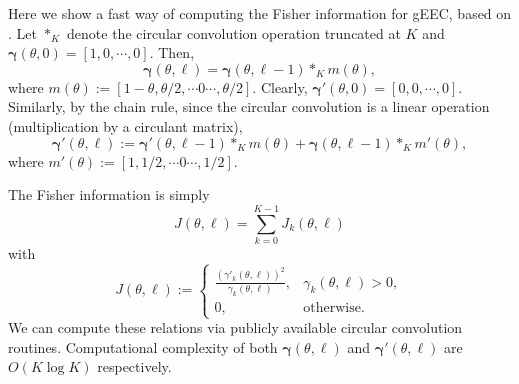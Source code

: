 \documentclass[12pt]{article}
\numberwithin{equation}{section}
\numberwithin{table}{section}
\numberwithin{figure}{section}
\newcommand{\be}{\begin{equation}}
\newcommand{\ee}{\end{equation}}
\def\bgamma{\boldsymbol{\gamma}}
\begin{document}
Here we show a fast way of computing the Fisher information for gEEC, based on \cite[Lemma 1]{Hua12gEEC}. Let $\ast_K$ denote the circular 
convolution operation truncated at $K$
and $\bgamma(\theta,0) = [1,0,\cdots,0]$. Then, 
\be
\bgamma(\theta,\ell) = \bgamma(\theta,\ell-1) \ast_K m(\theta),
\ee
where $m(\theta) := [1-\theta,\theta/2,\cdots 0 \cdots,\theta/2]$. Clearly, $\bgamma'(\theta,0) = [0,0,\cdots,0]$. Similarly, by the chain rule, since 
the circular convolution is a linear operation (multiplication by a circulant matrix),
\be
\bgamma'(\theta,\ell) := \bgamma'(\theta,\ell-1) \ast_K m(\theta) + \bgamma(\theta,\ell-1) \ast_K m'(\theta),
\ee
where $m'(\theta) :=  [1,1/2,\cdots 0 \cdots,1/2]$. 

The Fisher information is simply
\be
J(\theta,\ell) = \sum_{k=0}^{K-1} J_k(\theta,\ell)
\ee
with
\be
J(\theta,\ell) := 
\begin{cases}
\frac{(\gamma'_k(\theta,\ell))^2}{\gamma_k(\theta,\ell)}, & \gamma_k(\theta,\ell) > 0,\\
0, & \text{otherwise}.
\end{cases}
\ee
We can compute these relations via publicly available circular convolution routines. Computational complexity of both $\bgamma(\theta,\ell)$ 
and $\bgamma'(\theta,\ell)$ are $O(K \log K)$ respectively.

 
\appendix



\end{document}
